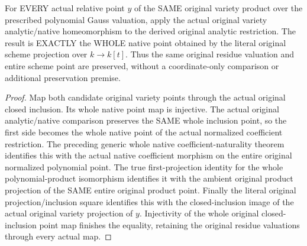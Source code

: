 \begin{theorem}
\label{local:actual-product-restriction-native-projection}
\leanok
{}
For EVERY actual relative point $y$ of the SAME original variety product
over the prescribed polynomial Gauss valuation, apply the actual original
variety analytic/native homeomorphism to the derived original analytic
restriction. The result is EXACTLY the WHOLE native point obtained by
the literal original scheme projection over $k\to k[t]$. Thus the same
original residue valuation and entire scheme point are preserved,
without a coordinate-only comparison or additional preservation premise.
\end{theorem}
\begin{proof}
Map both candidate original variety points through the actual original
closed inclusion. Its whole native point map is injective. The actual
original analytic/native comparison preserves the SAME whole inclusion
point, so the first side becomes the whole native point of the actual
normalized coefficient restriction. The preceding generic whole native
coefficient-naturality theorem identifies this with the actual native
coefficient morphism on the entire original normalized polynomial point.
The true first-projection identity for the whole polynomial-product
isomorphism identifies it with the ambient original product projection
of the SAME entire original product point. Finally the literal original
projection/inclusion square identifies this with the closed-inclusion
image of the actual original variety projection of $y$. Injectivity of
the whole original closed-inclusion point map finishes the equality,
retaining the original residue valuations through every actual map.
\end{proof}
